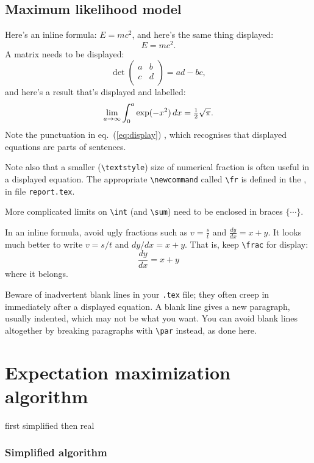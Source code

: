 \subsection{Maximum likelihood model}
Here's an inline formula: \(E=mc^2\), and here's the same
thing displayed:\[E=mc^2.\]A matrix needs to be displayed:
\[  \det\left(\begin{array}{cc}
        a & b \\  c & d \\
      \end{array}\right) = ad-bc,   \]
and here's a result that's displayed and labelled:
\begin{equation}\label{eq:display}
\lim_{a\to\infty}\int_0^a\exp(-x^2)\,dx={\textstyle\frac{1}{2}}\sqrt\pi.
\end{equation}Note the punctuation in eq.~(\ref{eq:display}) \etc,
which recognises that displayed equations are parts of sentences.
\par
Note also that a smaller (\verb+\textstyle+) size of numerical fraction
is often useful in a displayed equation. The appropriate
\verb+\newcommand+ called \verb+\fr+ is defined in the
, in file \texttt{report.tex}.
\par
More complicated limits on \verb+\int+ (and \verb+\sum+) need to
be enclosed in braces $\{\cdots\}$.
\par
In an inline formula, avoid ugly fractions such as \(v=\frac st\) and
\(\frac{dy}{dx}=x+y\). It looks much better to write \(v=s/t\) and
\(dy/dx=x+y\). That is, keep \verb+\frac+ for
display:\[\frac{dy}{dx}=x+y\]where it belongs.
\par
Beware of inadvertent blank lines in your \texttt{.tex} file; they often
creep in immediately after a displayed equation. A blank line gives a
new paragraph, usually indented, which may not be what you want. You can 
avoid blank lines altogether by breaking paragraphs with \verb+\par+
instead, as done here.
%
\section{Expectation maximization algorithm}
first simplified then real
\subsubsection{Simplified algorithm}
